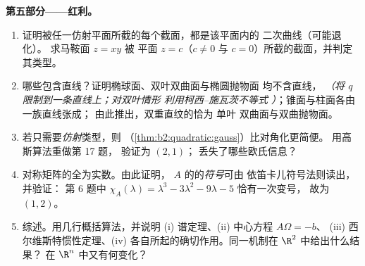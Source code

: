 \begin{problem}
\medskip
\noindent\textbf{第五部分——红利。}
\begin{enumerate}[resume]
  \item 证明被任一仿射平面所截的每个截面，都是该平面内的
        二次曲线（可能退化）。
        求马鞍面 $z = xy$ 被
        平面 $z = c$（$c \neq 0$ 与 $c = 0$）所截的截面，并判定其类型。
  \item 哪些包含直线？证明椭球面、双叶双曲面与椭圆抛物面
        均不含直线，
        \emph{（将 $q$ 限制到一条直线上；对双叶情形
        利用柯西–施瓦茨不等式
        ）}；锥面与柱面各由一族直线张成；
        由此推出，双重直纹的恰为
        单叶
        双曲面与双曲抛物面。
  \item 若只需要\emph{仿射}类型，则
        （\cref{thm:b2:quadratic:gauss}）比对角化更简便。
        用高斯算法重做第 17 题，
        验证为 $(2, 1)$；
        丢失了哪些欧氏信息？
  \item 对称矩阵的全为实数。由此证明，
        $A$ 的的\emph{符号}可由
        依笛卡儿符号法则读出，
        并验证：
        第 6 题中 $\chi_A(\lambda) = \lambda^3 - 3\lambda^2
        - 9\lambda - 5$ 恰有一次变号，
        故为 $(1, 2)$。
  \item 综述。用几行概括算法，并说明
        (i) 谱定理、(ii) 中心方程 $A\Omega = -b$、
        (iii) 西尔维斯特惯性定理、(iv) 
        各自所起的确切作用。同一机制在
        $\R^2$ 中给出什么结果？
        在 $\R^n$ 中又有何变化？
\end{enumerate}
\end{problem}
